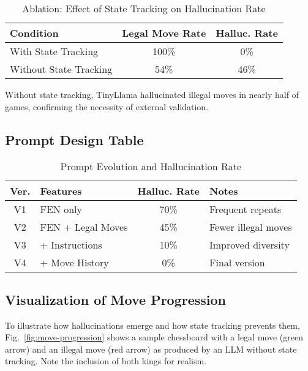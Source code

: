 \documentclass[conference]{IEEEtran}
\begin{document}
\begin{table}[H]
\centering
\caption{Ablation: Effect of State Tracking on Hallucination Rate}
\begin{tabular}{|l|c|c|}
\hline
\textbf{Condition} & \textbf{Legal Move Rate} & \textbf{Halluc. Rate} \\
\hline
With State Tracking & 100\% & 0\% \\
Without State Tracking & 54\% & 46\% \\
\hline
\end{tabular}
\end{table}

Without state tracking, TinyLlama hallucinated illegal moves in nearly half of games, confirming the necessity of external validation.

\subsection{Prompt Design Table}
\begin{table}[H]
\centering
\caption{Prompt Evolution and Hallucination Rate}
\begin{tabular}{|c|l|c|l|}
\hline
\textbf{Ver.} & \textbf{Features} & \textbf{Halluc. Rate} & \textbf{Notes} \\
\hline
V1 & FEN only & 70\% & Frequent repeats \\
V2 & FEN + Legal Moves & 45\% & Fewer illegal moves \\
V3 & + Instructions & 10\% & Improved diversity \\
V4 & + Move History & 0\% & Final version \\
\hline
\end{tabular}
\end{table}

\subsection{Visualization of Move Progression}
To illustrate how hallucinations emerge and how state tracking prevents them, Fig.~\ref{fig:move-progression} shows a sample chessboard with a legal move (green arrow) and an illegal move (red arrow) as produced by an LLM without state tracking. Note the inclusion of both kings for realism.
\end{document}
